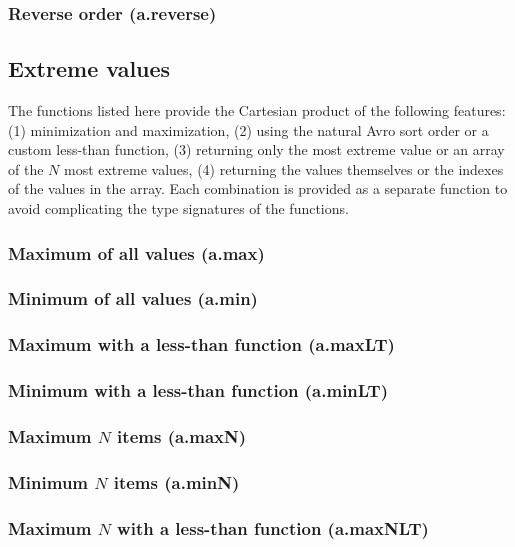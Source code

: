 \documentclass{article}
\theoremstyle{definition}
\begin{document}
\subsubsection{Reverse order (a.reverse)}

\subsection{Extreme values}

The functions listed here provide the Cartesian product of the following features: (1) minimization and maximization, (2) using the natural Avro sort order or a custom less-than function, (3) returning only the most extreme value or an array of the $N$ most extreme values, (4) returning the values themselves or the indexes of the values in the array.  Each combination is provided as a separate function to avoid complicating the type signatures of the functions.

\subsubsection{Maximum of all values (a.max)}

\subsubsection{Minimum of all values (a.min)}

\subsubsection{Maximum with a less-than function (a.maxLT)}

\subsubsection{Minimum with a less-than function (a.minLT)}

\subsubsection{Maximum $N$ items (a.maxN)}

\subsubsection{Minimum $N$ items (a.minN)}

\subsubsection{Maximum $N$ with a less-than function (a.maxNLT)}
\end{document}
